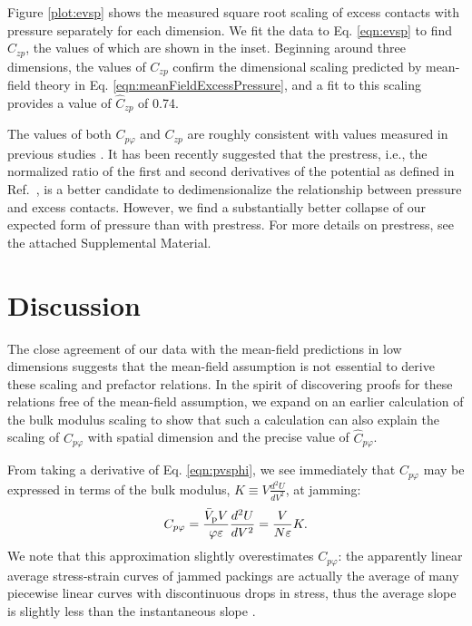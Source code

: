 Figure \ref{plot:evsp} shows the measured square root scaling of excess contacts with pressure separately for each dimension. We fit the data to Eq. \ref{eqn:evsp} to find $C_{zp}$, the values of which are shown in the inset. Beginning around three dimensions, the values of $C_{zp}$ confirm the dimensional scaling predicted by mean-field theory in Eq. \ref{eqn:meanFieldExcessPressure}, and a fit to this scaling provides a value of $\hat{C}_{zp}$ of 0.74.

The values of both $C_{p\varphi}$ and $C_{zp}$ are roughly consistent with values measured in previous studies \cite{ohern_jamming_2003, sartor_direct_2020}. It has been recently suggested that the prestress, i.e., the normalized ratio of the first and second derivatives of the potential as defined in Ref.~\cite{shimada_low-frequency_2019}, is a better candidate to dedimensionalize the relationship between pressure and excess contacts. However, we find a substantially better collapse of our expected form of pressure than with prestress. For more details on prestress, see the attached Supplemental Material.

\section{Discussion}
The close agreement of our data with the mean-field predictions in low dimensions suggests that the mean-field assumption is not essential to derive these scaling and prefactor relations. In the spirit of discovering proofs for these relations free of the mean-field assumption, we expand on an earlier calculation of the bulk modulus scaling \cite{wyart_rigidity_2005} to show that such a calculation can also explain the scaling of $C_{p \varphi}$ with spatial dimension and the precise value of $\hat{C}_{p \varphi}$.


From taking a derivative of Eq. \ref{eqn:pvsphi}, we see immediately that $C_{p\varphi}$ may be expressed in terms of the bulk modulus, $K\equiv V\frac{d^2U}{dV^2}$, at jamming:
%
\begin{equation} 
C_{p \varphi} = \frac{\bar{V}_{\mathrm{p}} V}{ \varphi \varepsilon}  \frac{d^2 U}{dV^2} = \frac{V}{N \varepsilon } K \label{eqn:CisK}.
\end{equation}
%
We note that this approximation slightly overestimates $C_{p\varphi}$: the apparently linear average stress-strain curves of jammed packings are actually the average of many piecewise linear curves with discontinuous drops in stress, thus the average slope is slightly less than the instantaneous slope \cite{fan_particle_2017}.

